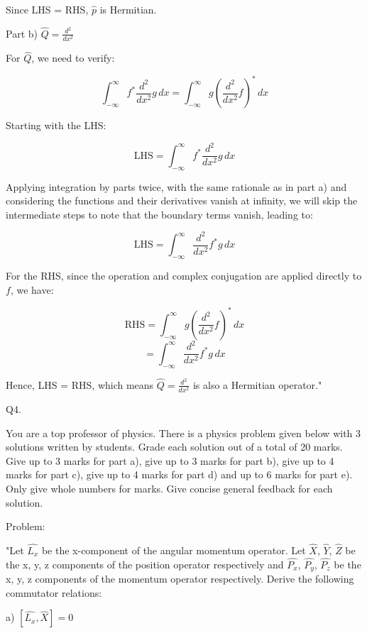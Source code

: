 Since LHS = RHS, \( \hat{p} \) is Hermitian.

Part b) \( \hat{Q} = \frac{d^{2}}{dx^{2}} \)

For \( \hat{Q} \), we need to verify:

\[ \int_{-\infty}^{\infty} f^{*}\frac{d^{2}}{dx^{2}}g \, dx = \int_{-\infty}^{\infty} g(\frac{d^{2}}{dx^{2}}f)^{*} \, dx \]

Starting with the LHS:

\[ \text{LHS} = \int_{-\infty}^{\infty} f^{*}\frac{d^{2}}{dx^{2}}g \, dx \]

Applying integration by parts twice, with the same rationale as in part a) and considering the functions and their derivatives vanish at infinity, we will skip the intermediate steps to note that the boundary terms vanish, leading to:

\[ \text{LHS} = \int_{-\infty}^{\infty} \frac{d^{2}}{dx^{2}}f^{*} g \, dx \]

For the RHS, since the operation and complex conjugation are applied directly to \( f \), we have:

\[ \text{RHS} = \int_{-\infty}^{\infty} g(\frac{d^{2}}{dx^{2}}f)^{*} \, dx \]
\[ = \int_{-\infty}^{\infty} \frac{d^{2}}{dx^{2}}f^{*} g \, dx \]

Hence, LHS = RHS, which means \( \hat{Q} = \frac{d^{2}}{dx^{2}} \) is also a Hermitian operator."



                           Q4. 

You are a top professor of physics. There is a physics problem given below with 3 solutions written by students. Grade each solution out of a total of 20 marks. Give up to 3 marks for part a), give up to 3 marks for part b), give up to 4 marks for part c), give up to 4 marks for part d) and up to 6 marks for part e). Only give whole numbers for marks. Give concise general feedback for each solution. 

Problem:

"Let \( \hat{L_{x}} \) be the x-component of the angular momentum operator. Let \( \hat{X} \), \( \hat{Y} \), \( \hat{Z} \) be the x, y, z components of the position operator respectively and \( \hat{P_{x}} \), \( \hat{P_{y}} \), \( \hat{P_{z}} \)  be the x, y, z components of the momentum operator respectively. Derive the following commutator relations:

a) \( \left[ \hat{L_{x}}, \hat{X} \right] = 0 \)

